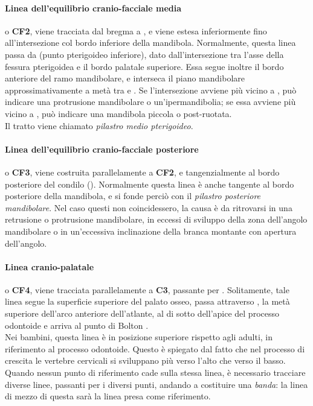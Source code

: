 \paragraph{Linea dell'equilibrio cranio-facciale media} o \textbf{CF2}, viene tracciata dal bregma  a , e viene estesa inferiormente fino all'intersezione col bordo inferiore della mandibola. Normalmente, questa linea passa da  (punto pterigoideo inferiore), dato dall'intersezione tra l'asse della fessura pterigoidea e il bordo palatale superiore. Essa segue inoltre il bordo anteriore del ramo mandibolare, e interseca il piano mandibolare approssimativamente a metà tra  e . Se l'intersezione avviene più vicino a , può indicare una protrusione mandibolare o un'ipermandibolia; se essa avviene più vicino a , può indicare una mandibola piccola o post-ruotata.\\
Il tratto  viene chiamato \emph{pilastro medio pterigoideo}.\\

\paragraph{Linea dell'equilibrio cranio-facciale posteriore} o \textbf{CF3}, viene costruita parallelamente a \textbf{CF2}, e tangenzialmente al bordo posteriore del condilo (). Normalmente questa linea è anche tangente al bordo posteriore della mandibola, e si fonde perciò con il \emph{pilastro posteriore mandibolare}. Nel caso questi non coincidessero, la causa è da ritrovarsi in una retrusione o protrusione mandibolare, in eccessi di sviluppo della zona dell'angolo mandibolare o in un'eccessiva inclinazione della branca montante con apertura dell'angolo.

\paragraph{Linea cranio-palatale} o \textbf{CF4}, viene tracciata parallelamente a \textbf{C3}, passante per . Solitamente, tale linea segue la superficie superiore del palato osseo, passa attraverso , la metà superiore dell'arco anteriore dell'atlante, al di sotto dell'apice del processo odontoide e arriva al punto di Bolton .\\
Nei bambini, questa linea è in posizione superiore rispetto agli adulti, in riferimento al processo odontoide. Questo è spiegato dal fatto che nel processo di crescita le vertebre cervicali si sviluppano più verso l'alto che verso il basso.\\
Quando nessun punto di riferimento cade sulla stessa linea, è necessario tracciare diverse linee, passanti per i diversi punti, andando a costituire una \emph{banda}: la linea di mezzo di questa sarà la linea presa come riferimento.

